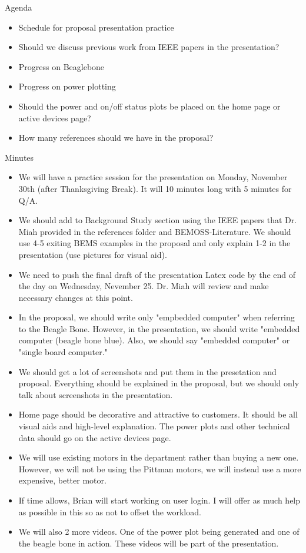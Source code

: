 \documentclass[fontsize=11pt, %
                             paper=letter, %
                             openany, %
                             captions=tableheading,
                             index=totoc,
                             hyperref]{labbook}
\begin{document}
Agenda
\begin{itemize}
\item Schedule for proposal presentation practice
\item Should we discuss previous work from IEEE papers in the presentation?
\item Progress on Beaglebone
\item Progress on power plotting
\item Should the power and on/off status plots be placed on the home page or active devices page?
\item How many references should we have in the proposal?
\end{itemize}
Minutes
\begin{itemize}
\item We will have a practice session for the presentation on Monday, November 30th (after Thanksgiving Break). It will 10 minutes long with 5 minutes for Q/A.
\item We should add to Background Study section using the IEEE papers that Dr. Miah provided in the references folder and BEMOSS-Literature. We should use 4-5 exiting BEMS examples in the proposal and only explain 1-2 in the presentation (use pictures for visual aid).
\item We need to push the final draft of the presentation Latex code by the end of the day on Wednesday, Nevember 25. Dr. Miah will review and make necessary changes at this point.
\item In the proposal, we should write only "empbedded computer" when referring to the Beagle Bone. However, in the presentation, we should write "embedded computer (beagle bone blue). Also, we should say "embedded computer" or "single board computer."
\item We should get  a lot of screenshots and put them in the presetation and proposal. Everything should be explained in the proposal, but we should only talk about screenshots in the presentation.
\item Home page should be decorative and attractive to customers. It should be all visual aids and high-level explanation. The power plots and other technical data should go on the active devices page.
\item We will use existing motors in the department rather than buying a new one. However, we will not be using the Pittman motors, we will instead use a more expensive, better motor.
\item If time allows, Brian will start working on user login. I will offer as much help as possible in this so as not to offset the workload. 
\item We will also 2 more videos. One of the power plot being generated and one of the beagle bone in action. These videos will be part of the presentation.
\end{itemize}
\end{document}
